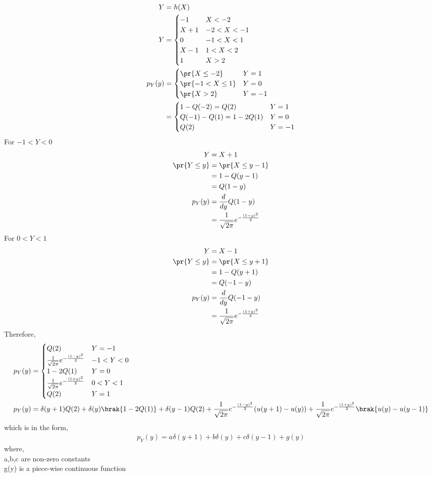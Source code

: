 \documentclass[book,11pt]{IEEEtran}
\begin{document}
\solution
\begin{align}
Y&=h(X)\\
Y&=
\begin{cases}
-1 & X<-2\\
X+1 & -2<X<-1\\
0 & -1<X<1\\
X-1 & 1<X<2\\
1 & X>2
\end{cases}\\
p_Y(y)&=
\begin{cases}
\pr{X\leq -2} & Y=1\\
\pr{-1<X\leq 1} & Y=0\\
\pr{X>2} & Y=-1
\end{cases}\\
&=
\begin{cases}
1-Q(-2)=Q(2) & Y=1\\
Q(-1)-Q(1)=1-2Q(1) & Y=0\\
Q(2) & Y=-1
\end{cases}
\end{align}
For $-1<Y<0$
\begin{align}
Y&=X+1\\
\pr{Y\leq y}&=\pr{X\leq y-1}\\
&=1-Q(y-1)\\
&=Q(1-y)\\
p_Y(y)&=\frac{d}{dy}Q(1-y)\\
&=\frac{1}{\sqrt{2\pi}}e^{-\frac{(1-y)^2}{2}}
\end{align}
For $0<Y<1$
\begin{align}
Y&=X-1\\
\pr{Y\leq y}&=\pr{X\leq y+1}\\
&=1-Q(y+1)\\
&=Q(-1-y)\\
p_Y(y)&=\frac{d}{dy}Q(-1-y)\\
&=\frac{1}{\sqrt{2\pi}}e^{-\frac{(1+y)^2}{2}}
\end{align}
Therefore,
\begin{align}
p_Y(y)&=
\begin{cases}
Q(2) & Y=-1\\
\frac{1}{\sqrt{2\pi}}e^{-\frac{(1-y)^2}{2}} & -1<Y<0\\
1-2Q(1) & Y=0\\
\frac{1}{\sqrt{2\pi}}e^{-\frac{(1+y)^2}{2}} & 0<Y<1\\
Q(2) & Y=1
\end{cases}\\
p_Y(y)&=\delta(y+1)Q(2)+\delta(y)\brak{1-2Q(1)}+\delta(y-1)Q(2)+\frac{1}{\sqrt{2\pi}}e^{-\frac{(1-y)^2}{2}}(u(y+1)-u(y))+\frac{1}{\sqrt{2\pi}}e^{-\frac{(1+y)^2}{2}}\brak{u(y)-u(y-1)}
\end{align}
which is in the form,
\begin{align}
p_Y(y)=a\delta (y+1) + b\delta (y) + c\delta (y-1) + g(y)
\end{align}
where,\\
a,b,c are non-zero constants\\
g(y) is a piece-wise continuous function
\end{document}
